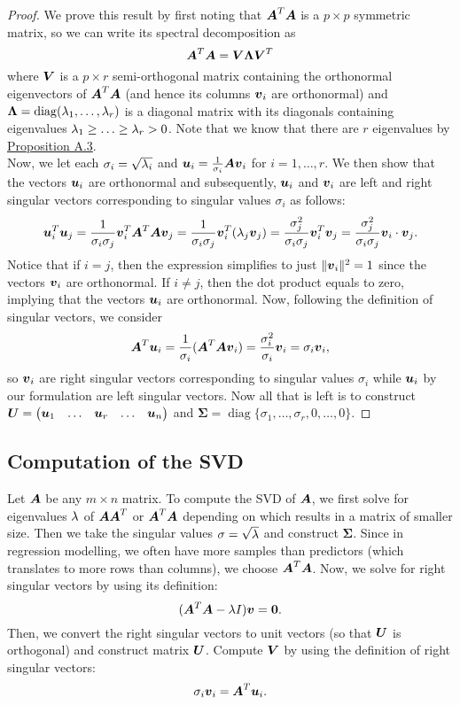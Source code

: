 \documentclass[12pt]{article}
\DeclareMathOperator{\diag}{diag}
\newcommand{\Sg}{\Sigma}
\begin{document}
	\begin{proof}
		We prove this result by first noting that $\boldsymbol{A}^T\boldsymbol{A}$ is a $p\times p$ symmetric matrix, so we can write its spectral decomposition as
		$$\boldsymbol{A}^T\boldsymbol{A}=\boldsymbol{V}\boldsymbol{\Lambda}\boldsymbol{V}^T$$
		where $\boldsymbol{V}$ is a $p\times r$ {semi-orthogonal} matrix containing the orthonormal eigenvectors of $\boldsymbol{A}^T\boldsymbol{A}$ (and hence its columns $\boldsymbol{v}_i$ are orthonormal) and $\boldsymbol{\Lambda}=\diag(\lm_1,\ldots,\lm_r)$ is a diagonal matrix with its diagonals containing eigenvalues $\lambda_1\geq\ldots\geq\lambda_r>0$. Note that we know that there are $r$ eigenvalues by \hyperref[prop1]{Proposition A.3}. \\
		
		Now, we let each $\sigma_i=\sqrt{\lambda_i}$ and $\boldsymbol{u}_i=\frac{1}{\sigma_i}\boldsymbol{A}\boldsymbol{v}_i$ for $i=1,\ldots,r$. We then show that the vectors $\boldsymbol{u}_i$ are orthonormal and subsequently, $\boldsymbol{u}_i$ and $\boldsymbol{v}_i$ are left and right singular vectors corresponding to singular values $\sigma_i$ as follows:
		\begin{align*}
			\boldsymbol{u}_i^T\boldsymbol{u}_j
			=\frac{1}{\sigma_i\sigma_j}\boldsymbol{v}_i^T{\boldsymbol{A}^T\boldsymbol{A}\boldsymbol{v}_j}
			=\frac{1}{\sigma_i\sigma_j}\boldsymbol{v}_i^T({\lambda_j\boldsymbol{v}_j})
			=\frac{\sigma_j^2}{\sigma_i\sigma_j}\boldsymbol{v}_i^T\boldsymbol{v}_j
			=\frac{\sigma_j^2}{\sigma_i\sigma_j}\boldsymbol{v}_i\cdot\boldsymbol{v}_j.
		\end{align*}
		Notice that if $i=j$, then the expression simplifies to just $\|\boldsymbol{v}_i\|^2=1$ since the vectors $\boldsymbol{v}_i$ are orthonormal. If $i\neq j$, then the dot product equals to zero, implying that the vectors $\boldsymbol{u}_i$ are orthonormal. Now, following the definition of singular vectors, we consider
		$$\boldsymbol{A}^T{\boldsymbol{u}_i}={\frac{1}{\sigma_i}}(\boldsymbol{A}^T{\boldsymbol{A}\boldsymbol{v}_i})=\frac{{\sigma_i^2}}{\sigma_i}{\boldsymbol{v}_i}=\sigma_i\boldsymbol{v}_i,$$
		so $\boldsymbol{v}_i$ are right singular vectors corresponding to singular values $\sigma_i$ while $\boldsymbol{u}_i$ by our formulation are left singular vectors. Now all that is left is to construct $\boldsymbol{U}=\begin{pmatrix}
			\boldsymbol{u}_1 & \ldots & \boldsymbol{u}_r & \ldots & \boldsymbol{u}_n
		\end{pmatrix}$ and $\boldsymbol{\Sg}=\diag\{\sigma_1,\ldots,\sigma_r,0,\ldots,0\}$. 
	\end{proof}
	
	\subsection{Computation of the SVD}
	Let $\boldsymbol{A}$ be any $m\times n$ matrix. To compute the SVD of $\boldsymbol{A}$, we first solve for eigenvalues $\lambda$ of $\boldsymbol{A}\boldsymbol{A}^T$ or $\boldsymbol{A}^T\boldsymbol{A}$ depending on which results in a matrix of smaller size. Then we take the singular values $\sigma=\sqrt{\lambda}$ and construct $\boldsymbol{\Sg}$. Since in regression modelling, we often have more samples than predictors (which translates to more rows than columns), we choose $\boldsymbol{A}^T\boldsymbol{A}$. Now, we solve for right singular vectors by using its definition:
	$$(\boldsymbol{A}^T\boldsymbol{A}-\lambda I)\boldsymbol{v}=\textbf{0}.$$
	Then, we convert the right singular vectors to unit vectors (so that $\boldsymbol{U}$ is orthogonal) and construct matrix $\boldsymbol{U}$. Compute $\boldsymbol{V}$ by using the definition of right singular vectors:
	$$\sigma_i\boldsymbol{v}_i=\boldsymbol{A}^T\boldsymbol{u}_i.$$
	
\end{document}

